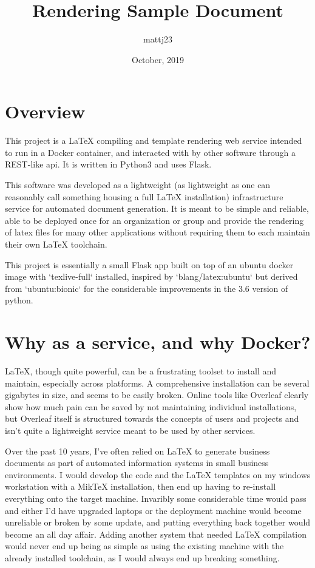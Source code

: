 \documentclass{article}
\title{Rendering Sample Document}
\author{mattj23}
\date{October, 2019}
\begin{document}
\maketitle

\section{Overview}
This project is a LaTeX compiling and template rendering web service intended to run in a Docker container, and interacted with by other software through a REST-like api. It is written in Python3 and uses Flask.

This software was developed as a lightweight (as lightweight as one can reasonably call something housing a full LaTeX installation) infrastructure service for automated document generation. It is meant to be simple and reliable, able to be deployed once for an organization or group and provide the rendering of latex files for many other applications without requiring them to each maintain their own LaTeX toolchain.

This project is essentially a small Flask app built on top of an ubuntu docker image with `texlive-full` installed, inspired by `blang/latex:ubuntu` but derived from `ubuntu:bionic` for the considerable improvements in the 3.6 version of python.

\section{Why as a service, and why Docker?}
LaTeX, though quite powerful, can be a frustrating toolset to install and maintain, especially across platforms. A comprehensive installation can be several gigabytes in size, and seems to be easily broken.  Online tools like Overleaf clearly show how much pain can be saved by not maintaining individual installations, but Overleaf itself is structured towards the concepts of users and projects and isn't quite a lightweight service meant to be used by other services.

Over the past 10 years, I've often relied on LaTeX to generate business documents as part of automated information systems in small business environments.  I would develop the code and the LaTeX templates on my windows workstation with a MikTeX installation, then end up having to re-install everything onto the target machine.  Invaribly some considerable time would pass and either I'd have upgraded laptops or the deployment machine would become unreliable or broken by some update, and putting everything back together would become an all day affair.  Adding another system that needed LaTeX compilation would never end up being as simple as using the existing machine with the already installed toolchain, as I would always end up breaking something.
\end{document}

